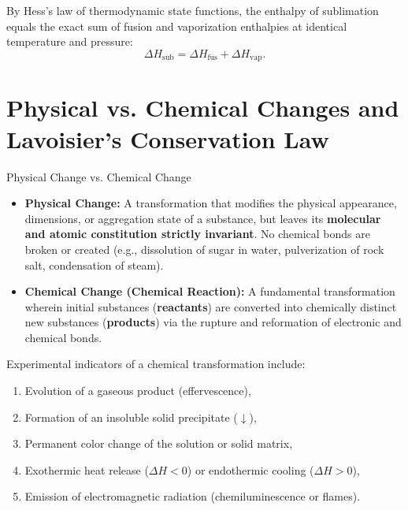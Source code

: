 By Hess's law of thermodynamic state functions, the enthalpy of sublimation equals the exact sum of fusion and vaporization enthalpies at identical temperature and pressure:
\begin{equation}
\Delta H_{\text{sub}} = \Delta H_{\text{fus}} + \Delta H_{\text{vap}}.
\end{equation}

\section{Physical vs. Chemical Changes and Lavoisier's Conservation Law}

\begin{definitionbox}{Physical Change vs. Chemical Change}
\begin{itemize}[leftmargin=1.5em,itemsep=3pt]
  \item \textbf{Physical Change:} A transformation that modifies the physical appearance, dimensions, or aggregation state of a substance, but leaves its \textbf{molecular and atomic constitution strictly invariant}. No chemical bonds are broken or created (e.g., dissolution of sugar in water, pulverization of rock salt, condensation of steam).
  \item \textbf{Chemical Change (Chemical Reaction):} A fundamental transformation wherein initial substances (\textbf{reactants}) are converted into chemically distinct new substances (\textbf{products}) via the rupture and reformation of electronic and chemical bonds.
\end{itemize}
\end{definitionbox}

Experimental indicators of a chemical transformation include:
\begin{enumerate}[leftmargin=1.5em,itemsep=2pt]
  \item Evolution of a gaseous product (effervescence),
  \item Formation of an insoluble solid precipitate ($\downarrow$),
  \item Permanent color change of the solution or solid matrix,
  \item Exothermic heat release ($\Delta H < 0$) or endothermic cooling ($\Delta H > 0$),
  \item Emission of electromagnetic radiation (chemiluminescence or flames).
\end{enumerate}

